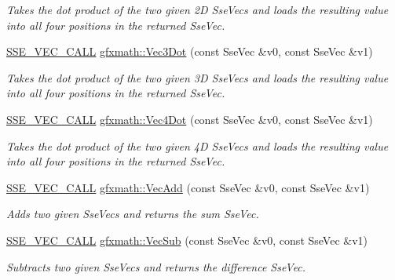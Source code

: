 \begin{DoxyCompactItemize}
\begin{DoxyCompactList}\small\item\em Takes the dot product of the two given 2\+D Sse\+Vecs and loads the resulting value into all four positions in the returned Sse\+Vec. \end{DoxyCompactList}\item 
\hyperlink{ssevec__math__defs_8h_a97454f977a5281455cecacce1e8ba670}{S\+S\+E\+\_\+\+V\+E\+C\+\_\+\+C\+A\+L\+L} \hyperlink{group___s_i_m_d_vec_math_ga3bf827d8c460ecc3cf412120d53fffbc}{gfxmath\+::\+Vec3\+Dot} (const Sse\+Vec \&v0, const Sse\+Vec \&v1)
\begin{DoxyCompactList}\small\item\em Takes the dot product of the two given 3\+D Sse\+Vecs and loads the resulting value into all four positions in the returned Sse\+Vec. \end{DoxyCompactList}\item 
\hyperlink{ssevec__math__defs_8h_a97454f977a5281455cecacce1e8ba670}{S\+S\+E\+\_\+\+V\+E\+C\+\_\+\+C\+A\+L\+L} \hyperlink{group___s_i_m_d_vec_math_gad3272988dd3696dda1f0e8dc4737884d}{gfxmath\+::\+Vec4\+Dot} (const Sse\+Vec \&v0, const Sse\+Vec \&v1)
\begin{DoxyCompactList}\small\item\em Takes the dot product of the two given 4\+D Sse\+Vecs and loads the resulting value into all four positions in the returned Sse\+Vec. \end{DoxyCompactList}\item 
\hyperlink{ssevec__math__defs_8h_a97454f977a5281455cecacce1e8ba670}{S\+S\+E\+\_\+\+V\+E\+C\+\_\+\+C\+A\+L\+L} \hyperlink{group___s_i_m_d_vec_math_gac4d06ed829409cb54c1a58dbcae58c11}{gfxmath\+::\+Vec\+Add} (const Sse\+Vec \&v0, const Sse\+Vec \&v1)
\begin{DoxyCompactList}\small\item\em Adds two given Sse\+Vecs and returns the sum Sse\+Vec. \end{DoxyCompactList}\item 
\hyperlink{ssevec__math__defs_8h_a97454f977a5281455cecacce1e8ba670}{S\+S\+E\+\_\+\+V\+E\+C\+\_\+\+C\+A\+L\+L} \hyperlink{group___s_i_m_d_vec_math_gae5b54b00d65ab7f3750f1b61a0607d65}{gfxmath\+::\+Vec\+Sub} (const Sse\+Vec \&v0, const Sse\+Vec \&v1)
\begin{DoxyCompactList}\small\item\em Subtracts two given Sse\+Vecs and returns the difference Sse\+Vec. \end{DoxyCompactList}\item 

\end{DoxyCompactItemize}
